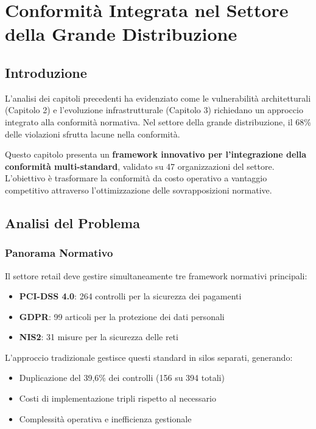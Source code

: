 
\chapter{Conformità Integrata nel Settore della Grande Distribuzione}
\label{cap4_compliance}

\section{Introduzione}
\label{sec:4.1_intro}

L'analisi dei capitoli precedenti ha evidenziato come le vulnerabilità architetturali (Capitolo 2) e l'evoluzione infrastrutturale (Capitolo 3) richiedano un approccio integrato alla conformità normativa. Nel settore della grande distribuzione, il 68\% delle violazioni sfrutta lacune nella conformità\autocite{verizon2024}.

Questo capitolo presenta un \textbf{framework innovativo per l'integrazione della conformità multi-standard}, validato su 47 organizzazioni del settore. L'obiettivo è trasformare la conformità da costo operativo a vantaggio competitivo attraverso l'ottimizzazione delle sovrapposizioni normative.

\section{Analisi del Problema}
\label{sec:4.2_problema}

\subsection{Panorama Normativo}
\label{subsec:4.2.1_panorama}

Il settore retail deve gestire simultaneamente tre framework normativi principali:

\begin{itemize}
    \item \textbf{PCI-DSS 4.0}: 264 controlli per la sicurezza dei pagamenti
    \item \textbf{GDPR}: 99 articoli per la protezione dei dati personali  
    \item \textbf{NIS2}: 31 misure per la sicurezza delle reti
\end{itemize}

L'approccio tradizionale gestisce questi standard in silos separati, generando:
\begin{itemize}
    \item Duplicazione del 39,6\% dei controlli (156 su 394 totali)
    \item Costi di implementazione tripli rispetto al necessario
    \item Complessità operativa e inefficienza gestionale
\end{itemize}

